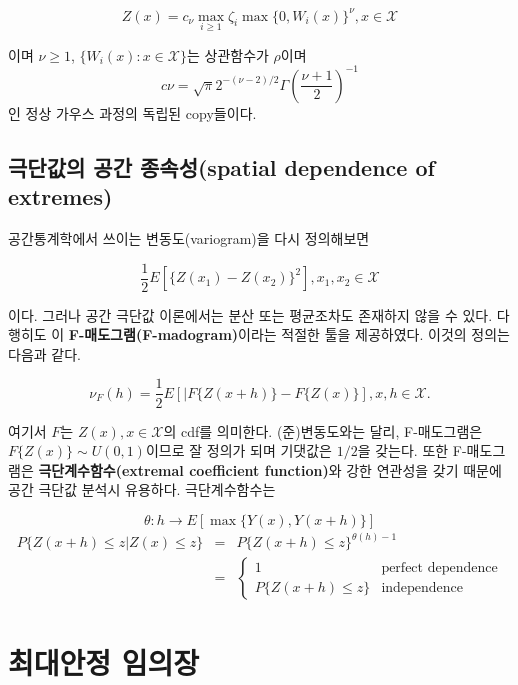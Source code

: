 \documentclass[b5paper,]{scrbook}
\theoremstyle{plain}
\theoremstyle{definition}
\numberwithin{equation}{section}
\begin{document}
\begin{equation}
Z(x)=c_{\nu}\max_{i \geq 1}\zeta_{i}\max\{0,W_{i}(x)\}^{\nu}, x\in\mathcal{X}
\end{equation}

이며 \(\nu \geq 1\), \(\{W_{i}(x):x\in\mathcal{X}\}\)는 상관함수가
\(\rho\)이며
\[c\nu =\sqrt{\pi}2^{-(\nu-2)/2}\Gamma(\frac{\nu+1}{2})^{-1}\] 인 정상
가우스 과정의 독립된 copy들이다.

\section{극단값의 공간 종속성(spatial dependence of
extremes)}\label{--spatial-dependence-of-extremes}

공간통계학에서 쓰이는 변동도(variogram)을 다시 정의해보면

\begin{equation}
\frac{1}{2}E[\{Z(x_{1})-Z(x_{2}) \}^{2}], x_{1}, x_{2} \in \mathcal{X}
\end{equation}

이다. 그러나 공간 극단값 이론에서는 분산 또는 평균조차도 존재하지 않을
수 있다. 다행히도 \citep{Cooley2006}이
\textbf{F-매도그램(F-madogram)}이라는 적절한 툴을 제공하였다. 이것의
정의는 다음과 같다.

\begin{equation}
\nu_{F}(h)=\frac{1}{2}E[|F\{Z(x+h)\}-F\{Z(x)\}], x,h\in \mathcal{X}.
\end{equation}

여기서 \(F\)는 \(Z(x), x\in\mathcal{X}\)의 cdf를 의미한다.
(준)변동도와는 달리, F-매도그램은 \(F\{Z(x)\} \sim U(0,1)\)이므로 잘
정의가 되며 기댓값은 \(1/2\)을 갖는다. 또한 F-매도그램은
\textbf{극단계수함수(extremal coefficient function)}와 강한 연관성을
갖기 때문에 공간 극단값 분석시 유용하다. 극단계수함수는

\begin{equation}
\theta : h \rightarrow E[\max \{ Y(x),Y(x+h) \}]
\end{equation}\begin{eqnarray}
P\{Z(x+h)\leq z | Z(x)\leq z\}&=&P\{Z(x+h)\leq z\}^{\theta(h)-1}\nonumber\\
&=&
\begin{cases}
1 & \text{perfect dependence}\\
P\{Z(x+h)\leq z\} & \text{independence}
\end{cases}
\end{eqnarray}

\chapter{최대안정 임의장}\label{maxstableRF}
\end{document}
